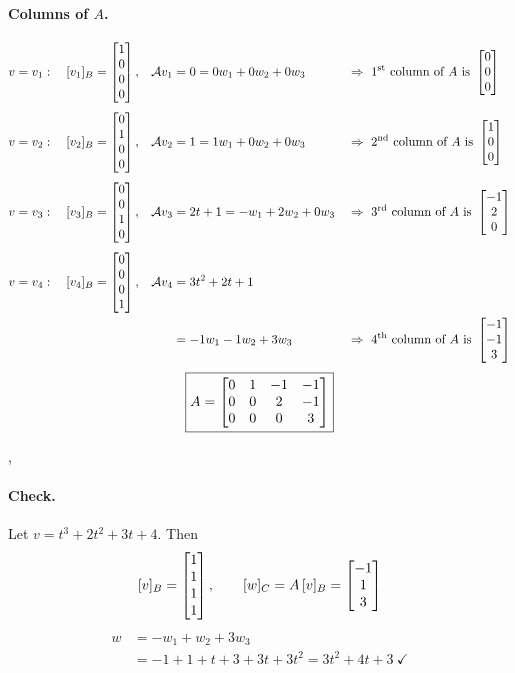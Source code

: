 \begin{example}
\paragraph{Columns of $A$.}
\begin{align*}
v=v_1:\quad [v_1]_B&=\bmat{1\\0\\0\\0}, & \mathcal{A}v_1&=0=0w_1+0w_2+0w_3 &&\Rightarrow\ 1^{\text{st}} \text{ column of } A \text{ is } \bmat{0\\0\\0}\\[4pt]
v=v_2:\quad [v_2]_B&=\bmat{0\\1\\0\\0}, & \mathcal{A}v_2&=1=1w_1+0w_2+0w_3 &&\Rightarrow\ 2^{\text{nd}} \text{ column of } A \text{ is } \bmat{1\\0\\0}\\[4pt]
v=v_3:\quad [v_3]_B&=\bmat{0\\0\\1\\0}, & \mathcal{A}v_3&=2t+1=-w_1+2w_2+0w_3 &&\Rightarrow\ 3^{\text{rd}} \text{ column of } A \text{ is } \bmat{-1\\2\\0}\\[4pt]
v=v_4:\quad [v_4]_B&=\bmat{0\\0\\0\\1}, & \mathcal{A}v_4&=3t^2+2t+1 &&\\*
&& &=-1w_1-1w_2+3w_3 &&\Rightarrow\ 4^{\text{th}} \text{ column of } A \text{ is } \bmat{-1\\-1\\3}
\end{align*}
\[
\boxed{A=\begin{bmatrix}0&1&-1&-1\\0&0&2&-1\\0&0&0&3\end{bmatrix}}
\]

\sep
%
\paragraph{Check.} Let $v=t^3+2t^2+3t+4$. Then
\[
[v]_B=\begin{bmatrix}1\\1\\1\\1\end{bmatrix}, \qquad [w]_C=A\,[v]_B=\begin{bmatrix}-1\\1\\3\end{bmatrix}
\]
\begin{align*}
w&=-w_1+w_2+3w_3\\
&=-1+1+t+3+3t+3t^2=3t^2+4t+3 \ \checkmark
\end{align*}
\end{example}

